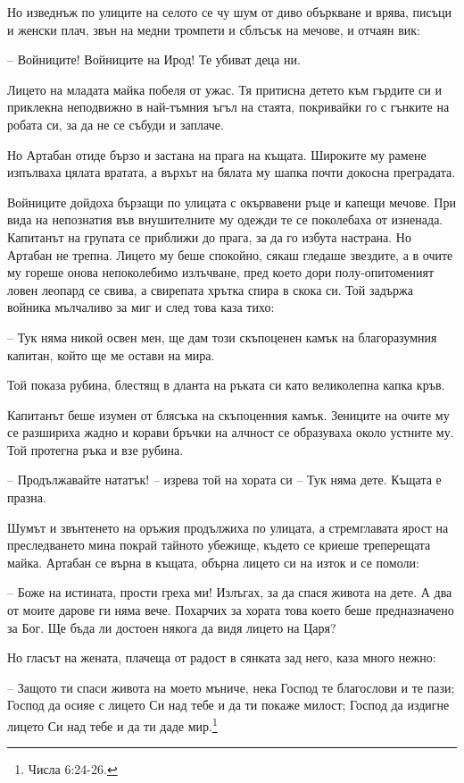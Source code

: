 Но изведнъж по улиците на селото се чу шум от диво объркване и врява, писъци и
женски плач, звън на медни тромпети и сблъсък на мечове, и отчаян вик:

-- Войниците! Войниците на Ирод! Те убиват деца ни.

Лицето на младата майка побеля от ужас. Тя притисна детето към гърдите си и
приклекна неподвижно в най-тъмния ъгъл на стаята, покривайки го с гънките на
робата си, за да не се събуди и заплаче.

Но Артабан отиде бързо и застана на прага на къщата. Широките му рамене
изпълваха цялата вратата, а върхът на бялата му шапка почти докосна преградата.

Войниците дойдоха бързащи по улицата с окървавени ръце и капещи мечове. При вида
на непознатия във внушителните му одежди те се поколебаха от изненада. Капитанът
на групата се приближи до прага, за да го избута настрана. Но Артабан не трепна.
Лицето му беше спокойно, сякаш гледаше звездите, а в очите му гореше онова
непоколебимо излъчване, пред което дори полу-опитоменият ловен леопард се свива,
а свирепата хрътка спира в скока си. Той задържа войника мълчаливо за миг и след
това каза тихо:

-- Тук няма никой освен мен, ще дам този скъпоценен камък на благоразумния
капитан, който ще ме остави на мира.

Той показа рубина, блестящ в дланта на ръката си като великолепна капка кръв.

Капитанът беше изумен от блясъка на скъпоценния камък. Зениците на очите му се
разшириха жадно и корави бръчки на алчност се образуваха около устните му. Той
протегна ръка и взе рубина.

-- Продължавайте нататък! -- изрева той на хората си -- Тук няма дете. Къщата е
празна.

Шумът и звънтенето на оръжия продължиха по улицата, а стремглавата ярост на
преследването мина покрай тайното убежище, където се криеше треперещата майка.
Артабан се върна в къщата, обърна лицето си на изток и се помоли:

-- Боже на истината, прости греха ми! Излъгах, за да спася живота на дете. А два
от моите дарове ги няма вече. Похарчих за хората това което беше предназначено
за Бог. Ще бъда ли достоен някога да видя лицето на Царя?

Но гласът на жената, плачеща от радост в сянката зад него, каза много нежно:

-- Защото ти спаси живота на моето мъниче, нека Господ те благослови и те пази;
Господ да осияе с лицето Си над тебе и да ти покаже милост; Господ да издигне
лицето Си над тебе и да ти даде мир.\footnote{Числа 6:24-26.}

